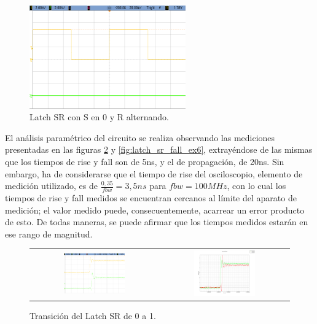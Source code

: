 \begin{figure}[H]
    \centering
    \includegraphics[width=0.6\textwidth]{../EJ6/Recursos/latch_sr_low}
    \caption{Latch SR con S en 0 y R alternando.}
    \label{fig:latch_sr_low_ex6}
\end{figure}

El análisis paramétrico del circuito se realiza observando las mediciones presentadas en las figuras \ref{fig:latch_sr_rise_ex6} y \ref{fig:latch_sr_fall_ex6}, 
extrayéndose de las mismas que los tiempos de rise y fall son de 5ns, y el de propagación, de 20ns.
Sin embargo, ha de considerarse que el tiempo de rise del osciloscopio, elemento de medición utilizado, es de $\frac{0,35}{fbw} = 3,5ns$ para $fbw = 100MHz$, con lo cual 
los tiempos de rise y fall medidos se encuentran cercanos al límite del aparato de medición; el valor medido puede, consecuentemente, acarrear un error producto de esto.
De todas maneras, se puede afirmar que los tiempos medidos estarán en ese rango de magnitud.

\begin{figure}[H]
    \centering
    \begin{tabular}{c c}
        \includegraphics[width=0.5\textwidth]{../EJ6/Recursos/latch_sr_rise_osc} &
        \includegraphics[width=0.5\textwidth]{../EJ6/Recursos/latch_sr_rise}
    \end{tabular}
    \caption{Transición del Latch SR de 0 a 1.}
    \label{fig:latch_sr_rise_ex6}
\end{figure}


